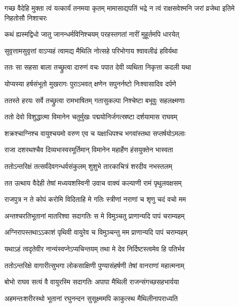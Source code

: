 \threelineshloka
{गच्छ वैदेहि मुक्ता त्वं यत्कार्यं तनमया कृतम्}
{मामासाद्यपतिं भद्रे न त्वं राक्षसवेश्मनि}
{जरां व्रजेथा इतिमे निहतोसौ निशाचरः}


\twolineshloka
{कथं ह्यस्मद्विधो जातु जानन्धर्मविनिश्चयम्}
{परहस्तगतां नारीं मुहूर्तमपि धारयेत्}


\twolineshloka
{सुवृत्तामसुवृत्तां वाऽप्यहं त्वामद्य मैथिलि}
{नोत्सहे परिभोगाय श्वावलीढं हविर्यथा}


\twolineshloka
{ततः सा सहसा बाला तच्छ्रुत्वा दारुणं वचः}
{पपात देवी व्यथिता निकृत्ता कदली यथा}


\twolineshloka
{योप्यस्या हर्षसंभूतो मुखरागः पुराऽभवत्}
{क्षणेन सपुनर्नष्टो निःश्वासादिव दर्पणे}


\twolineshloka
{ततस्ते हरयः सर्वे तच्छ्रुत्वा रामभाषितम्}
{गतासुकल्पा निश्चेष्टा बभूवुः सहलक्ष्मणाः}


\twolineshloka
{ततो देवो विशुद्धात्मा विमानेन चतुर्मुखः}
{पद्मयोनिर्जगत्स्रष्टा दर्शयामास राघवम्}


\twolineshloka
{शक्रश्चाग्निश्च वायुश्चयमो वरुण एव च}
{यक्षाधिपश्च भगवांस्तथा सप्तर्षयोऽमलाः}


\twolineshloka
{राजा दशरथश्चैव दिव्यभास्वरमूर्तिमान्}
{विमानेन महार्हेण हंसयुक्तेन भास्वता}


\twolineshloka
{ततोऽन्तरिक्षं तत्सर्वंदेवगन्धर्वसंकुलम्}
{शुशुभे तारकाचित्रं शरदीव नभस्तलम्}


\twolineshloka
{तत उत्थाय वैदेही तेषां मध्ययशस्विनी}
{उवाच वाक्यं कल्याणी रामं पृथुलवक्षसम्}


\twolineshloka
{राजपुत्र न ते कोपं करोमि विदिताहि मे}
{गतिः स्त्रीणां नराणां च शृणु चदं वचो मम}


\twolineshloka
{अन्तश्चरतिभूतानां मातरिश्वा सदागतिः}
{स मे विमुञ्चतु प्राणान्यदि पापं चराम्यहम्}


\twolineshloka
{अग्निरापस्तथाऽऽकाशं पृथिवी वायुरेव च}
{विमुञ्चन्तु मम प्राणान्यदि पापं चराम्यहम्}


\twolineshloka
{यथाऽहं त्वदृतेवीर नान्यंस्वप्नेऽप्यचिन्तयम्}
{तथा मे देव निर्दिष्टस्त्वमेव हि पतिर्भव}


\twolineshloka
{ततोऽन्तरिक्षे वागारीत्सुभगा लोकसाक्षिणी}
{पुण्यासंहर्षणी तेषां वानराणां महात्मनाम्}



\twolineshloka
{बोभो राघव सत्यं वै वायुरस्मि सदागतिः}
{अपापा मैथिली राजन्संगच्छसहभार्यया}



\twolineshloka
{अहमन्तःशरीरस्थो भूतानां रघुनन्दन}
{सुसूक्ष्ममपि काकुत्स्थ मैथिलीनापराध्यति}

